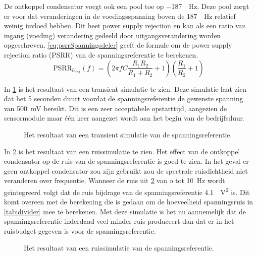 De ontkoppel condensator voegt ook een pool toe op \qty{-187}{\milli.\hertz}. Deze pool zorgt er voor dat veranderingen in de voedingsspanning boven de \qty{187}{\milli.\hertz} relatief weinig invloed hebben. Dit heet power supply rejection en kan als een ratio van ingang (voeding) verandering gedeeld door uitgangsverandering worden opgeschreven. \cref{eq:psrrSpanningsdeler} geeft de formule om de power supply rejection ratio (PSRR) van de spanningsreferentie te berekenen.
\begin{equation}\label{eq:psrrSpanningsdeler}
    \mathrm{PSRR}_{U_{ref}}\left(f\right)=\left(2\pi fC\frac{R_1R_2}{R_1+R_2}+1\right)\left(\frac{R_1}{R_2}+1\right)
\end{equation}

In \cref{fig:referenceSimTrans} is het resultaat van een transient simulatie te zien. Deze simulatie laat zien dat het 5 seconden duurt voordat de spanningsreferentie de gewenste spanning van \qty{500}{\milli\volt} bereikt. Dit is een zeer acceptabele opstarttijd, aangezien de sensormodule maar één keer aangezet wordt aan het begin van de bedrijfsduur.
\begin{figure}[!htb]
    \centering
    \pgfplotsset{width=0.7\textwidth}
    
    \caption{Het resultaat van een transient simulatie van de spanningsreferentie.}
    \label{fig:referenceSimTrans}
\end{figure}

In \cref{fig:referenceSimNoise} is het resultaat van een ruissimulatie te zien. Het effect van de ontkoppel condensator op de ruis van de spanningsreferentie is goed te zien. In het geval er geen ontkoppel condensator zou zijn gebruikt zou de spectrale ruisdichtheid niet veranderen over frequentie. Wanneer de ruis uit \cref{fig:referenceSimNoise} van o tot \qty{10}{\hertz} wordt geïntegreerd volgt dat de ruis bijdrage van de spanningsreferentie \qty{4.1}{\femto.\volt^2} is. Dit komt overeen met de berekening die is gedaan om de hoeveelheid spanningsruis in \cref{tab:divider} mee te berekenen. Met deze simulatie is het nu aannemelijk dat de spanningsreferentie inderdaad veel minder ruis produceert dan dat er in het ruisbudget gegeven is voor de spanningsreferentie.
\begin{figure}[!htb]
    \centering
    \pgfplotsset{width=0.7\textwidth}
    
    \caption{Het resultaat van een ruissimulatie van de spanningsreferentie.}
    \label{fig:referenceSimNoise}
\end{figure}


